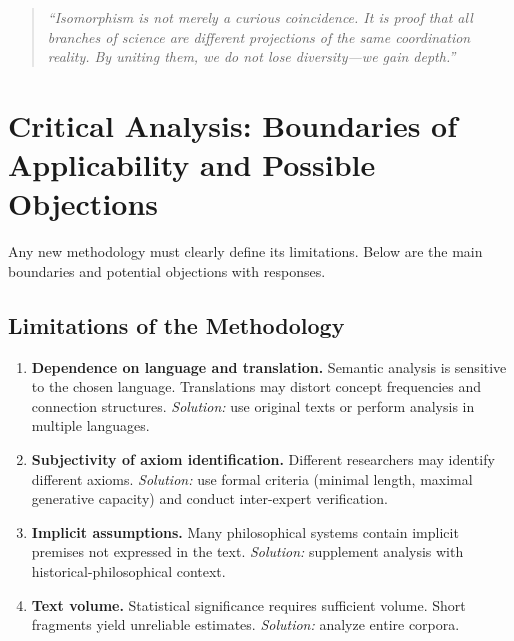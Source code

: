 \documentclass[12pt,a4paper]{article}
\begin{document}
	\begin{quote}
		\itshape
		``Isomorphism is not merely a curious coincidence. It is proof that all branches of science are different projections of the same coordination reality. By uniting them, we do not lose diversity—we gain depth.''
	\end{quote}
	
	
	\section{Critical Analysis: Boundaries of Applicability and Possible Objections}
	\label{sec:critical-analysis}
	
	Any new methodology must clearly define its limitations. Below are the main boundaries and potential objections with responses.
	
	\subsection{Limitations of the Methodology}
	
	\begin{enumerate}
		\item \textbf{Dependence on language and translation.} Semantic analysis is sensitive to the chosen language. Translations may distort concept frequencies and connection structures. \textit{Solution:} use original texts or perform analysis in multiple languages.
		\item \textbf{Subjectivity of axiom identification.} Different researchers may identify different axioms. \textit{Solution:} use formal criteria (minimal length, maximal generative capacity) and conduct inter-expert verification.
		\item \textbf{Implicit assumptions.} Many philosophical systems contain implicit premises not expressed in the text. \textit{Solution:} supplement analysis with historical-philosophical context.
		\item \textbf{Text volume.} Statistical significance requires sufficient volume. Short fragments yield unreliable estimates. \textit{Solution:} analyze entire corpora.
	\end{enumerate}
	
\end{document}
